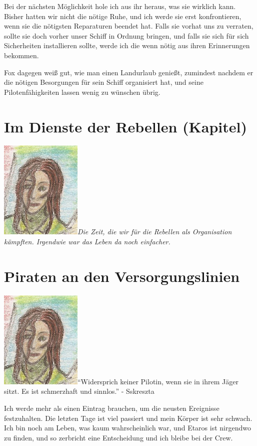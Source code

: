 \documentclass[11pt]{article}
\begin{document}
Bei der nächsten Möglichkeit hole ich aus ihr heraus, was sie wirklich
kann. Bisher hatten wir nicht die nötige Ruhe, und ich werde sie erst
konfrontieren, wenn sie die nötigsten Reparaturen beendet hat. Falls sie
vorhat uns zu verraten, sollte sie doch vorher unser Schiff in Ordnung
bringen, und falls sie sich für sich Sicherheiten installieren sollte,
werde ich die wenn nötig aus ihren Erinnerungen bekommen.

Fox dagegen weiß gut, wie man einen Landurlaub genießt, zumindest
nachdem er die nötigen Besorgungen für sein Schiff organisiert hat, und
seine Pilotenfähigkeiten lassen wenig zu wünschen übrig.

\section{Im Dienste der Rebellen (Kapitel)}

\includegraphics{sskreszta-portrait-alt-klein.png}\emph{Die Zeit,
die wir für die Rebellen als Organisation kämpften. Irgendwie war das
Leben da noch einfacher.}

\section{Piraten an den Versorgungslinien}

\includegraphics{sskreszta-portrait-alt-klein.png}``Widersprich
keiner Pilotin, wenn sie in ihrem Jäger sitzt. Es ist schmerzhaft und
sinnlos.'' - Sskreszta

Ich werde mehr als einen Eintrag brauchen, um die neusten Ereignisse
festzuhalten. Die letzten Tage ist viel passiert und mein Körper ist
sehr schwach. Ich bin noch am Leben, was kaum wahrscheinlich war, und
Etaros ist nirgendwo zu finden, und so zerbricht eine Entscheidung und
ich bleibe bei der Crew.
\end{document}
